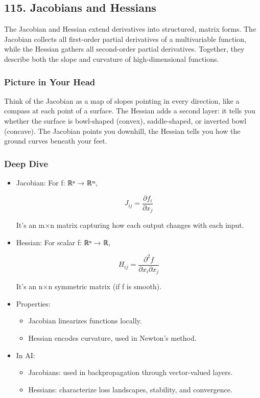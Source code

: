 \documentclass[
  letterpaper,
  DIV=11,
  numbers=noendperiod]{scrreprt}
\providecommand{\tightlist}{%
  \setlength{\itemsep}{0pt}\setlength{\parskip}{0pt}}
\begin{document}
\subsection{115. Jacobians and Hessians}\label{jacobians-and-hessians}

The Jacobian and Hessian extend derivatives into structured, matrix
forms. The Jacobian collects all first-order partial derivatives of a
multivariable function, while the Hessian gathers all second-order
partial derivatives. Together, they describe both the slope and
curvature of high-dimensional functions.

\subsubsection{Picture in Your Head}\label{picture-in-your-head-114}

Think of the Jacobian as a map of slopes pointing in every direction,
like a compass at each point of a surface. The Hessian adds a second
layer: it tells you whether the surface is bowl-shaped (convex),
saddle-shaped, or inverted bowl (concave). The Jacobian points you
downhill, the Hessian tells you how the ground curves beneath your feet.

\subsubsection{Deep Dive}\label{deep-dive-114}

\begin{itemize}
\item
  Jacobian: For f: ℝⁿ → ℝᵐ,

  \[
  J_{ij} = \frac{\partial f_i}{\partial x_j}
  \]

  It's an m×n matrix capturing how each output changes with each input.
\item
  Hessian: For scalar f: ℝⁿ → ℝ,

  \[
  H_{ij} = \frac{\partial^2 f}{\partial x_i \partial x_j}
  \]

  It's an n×n symmetric matrix (if f is smooth).
\item
  Properties:

  \begin{itemize}
  \tightlist
  \item
    Jacobian linearizes functions locally.
  \item
    Hessian encodes curvature, used in Newton's method.
  \end{itemize}
\item
  In AI:

  \begin{itemize}
  \tightlist
  \item
    Jacobians: used in backpropagation through vector-valued layers.
  \item
    Hessians: characterize loss landscapes, stability, and convergence.
  \end{itemize}
\end{itemize}
\end{document}
